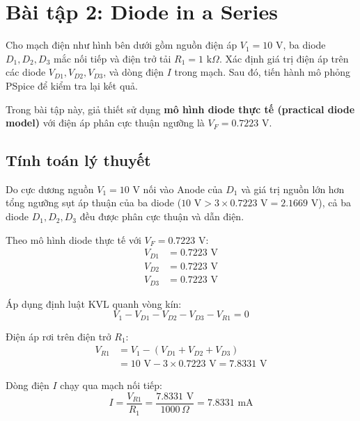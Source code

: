 \section{Bài tập 2: Diode in a Series}

Cho mạch điện như hình bên dưới gồm nguồn điện áp $V_1 = 10\text{ V}$, ba diode $D_1, D_2, D_3$ mắc nối tiếp và điện trở tải $R_1 = 1\text{ k}\Omega$. Xác định giá trị điện áp trên các diode $V_{D1}, V_{D2}, V_{D3}$, và dòng điện $I$ trong mạch. Sau đó, tiến hành mô phỏng PSpice để kiểm tra lại kết quả.

Trong bài tập này, giả thiết sử dụng \textbf{mô hình diode thực tế (practical diode model)} với điện áp phân cực thuận ngưỡng là $V_F = 0.7223\text{ V}$.


\subsection{Tính toán lý thuyết}
Do cực dương nguồn $V_1 = 10\text{ V}$ nối vào Anode của $D_1$ và giá trị nguồn lớn hơn tổng ngưỡng sụt áp thuận của ba diode ($10\text{ V} > 3 \times 0.7223\text{ V} = 2.1669\text{ V}$), cả ba diode $D_1, D_2, D_3$ đều được phân cực thuận và dẫn điện.

\noindent Theo mô hình diode thực tế với $V_F = 0.7223\text{ V}$:
\begin{align*}
  V_{D1} &= 0.7223\text{ V} \\
  V_{D2} &= 0.7223\text{ V} \\
  V_{D3} &= 0.7223\text{ V}
\end{align*}

\noindent Áp dụng định luật KVL quanh vòng kín:
\begin{equation}
  V_1 - V_{D1} - V_{D2} - V_{D3} - V_{R1} = 0
\end{equation}

\noindent Điện áp rơi trên điện trở $R_1$:
\begin{align*}
  V_{R1} &= V_1 - (V_{D1} + V_{D2} + V_{D3}) \\
         &= 10\text{ V} - 3 \times 0.7223\text{ V} = 7.8331\text{ V}
\end{align*}

\noindent Dòng điện $I$ chạy qua mạch nối tiếp:
\begin{equation}
  I = \frac{V_{R1}}{R_1} = \frac{7.8331\text{ V}}{1000\,\Omega} = 7.8331\text{ mA}
\end{equation}

